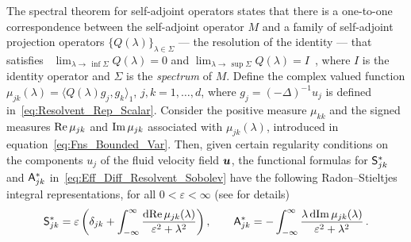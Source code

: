 \documentclass[amsa]{ipart}
\begin{document}
The spectral theorem for self-adjoint operators states that there is a
one-to-one correspondence between the self-adjoint operator $M$ and a
family of self-adjoint projection operators $\{Q(\lambda)\}_{\lambda\in\Sigma}$ --- the
resolution of the identity --- that satisfies~\cite{Stone:64} 
$\lim_{\lambda\to\,\inf{\Sigma}}Q(\lambda)=0$ and
$\lim_{\lambda\to\,\sup{\Sigma}}Q(\lambda)=I$~\cite{Stone:64}, where $I$ is the identity
operator and $\Sigma$ is the \emph{spectrum} of $M$. Define the complex
valued function $\mu_{jk}(\lambda)=\langle Q(\lambda)g_j,g_k\rangle_1$, $j,k=1,\ldots,d$, where
$g_j=(-\Delta)^{-1}u_j$ is defined
in~\eqref{eq:Resolvent_Rep_Scalar}. Consider the positive measure
$\mu_{kk}$ and the signed measures $\mbox{Re}\,\mu_{jk}$ and $\mbox{Im}\,\mu_{jk}$
associated with $\mu_{jk}(\lambda)$, introduced in
equation~\eqref{eq:Fns_Bounded_Var}.  Then, given certain regularity 
conditions on the components $u_j$ of the fluid velocity field
$\boldsymbol{u}$, the functional formulas for $\mathsf{S}^*_{jk}$ and
$\mathsf{A}^*_{jk}$ in~\eqref{eq:Eff_Diff_Resolvent_Sobolev} have
the following Radon--Stieltjes integral representations, for all
$0<\varepsilon<\infty$ (see  for details)
%
\begin{align}\label{eq:Integral_Rep_kappa*}
  \Sm^*_{jk}=\varepsilon\left(\delta_{jk}+\int_{-\infty}^\infty\frac{\d{\rm Re}\,\mu_{jk}(\lambda)}{\varepsilon^2+\lambda^2}\right),
  \qquad
  \Am^*_{jk}=-\int_{-\infty}^\infty\frac{\lambda\,\d{\rm Im}\,\mu_{jk}(\lambda)}{\varepsilon^2+\lambda^2}\,.         
\end{align}
\end{document}
